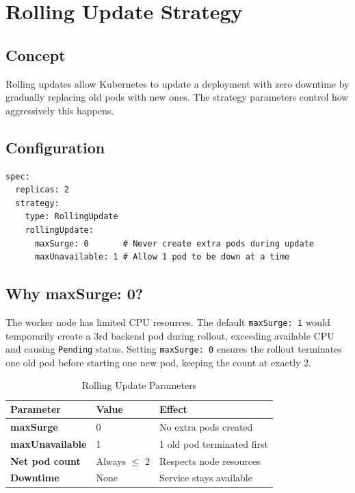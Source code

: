 \documentclass[12pt,a4paper]{report}
\begin{document}
\section{Rolling Update Strategy}

\subsection{Concept}

Rolling updates allow Kubernetes to update a deployment with zero downtime by gradually replacing old pods with new ones. The strategy parameters control how aggressively this happens.

\subsection{Configuration}

\begin{lstlisting}[style=yamlstyle, caption={Rolling Update Strategy (Backend)}]
spec:
  replicas: 2
  strategy:
    type: RollingUpdate
    rollingUpdate:
      maxSurge: 0       # Never create extra pods during update
      maxUnavailable: 1 # Allow 1 pod to be down at a time
\end{lstlisting}

\subsection{Why maxSurge: 0?}

The worker node has limited CPU resources. The default \texttt{maxSurge: 1} would temporarily create a 3rd backend pod during rollout, exceeding available CPU and causing \texttt{Pending} status. Setting \texttt{maxSurge: 0} ensures the rollout terminates one old pod before starting one new pod, keeping the count at exactly 2.

\begin{table}[H]
  \centering
  \begin{tabular}{>{\bfseries}p{4cm} p{4cm} p{5cm}}
    \toprule
    \textbf{Parameter} & \textbf{Value} & \textbf{Effect} \\
    \midrule
    maxSurge & 0 & No extra pods created \\
    maxUnavailable & 1 & 1 old pod terminated first \\
    Net pod count & Always $\leq$ 2 & Respects node resources \\
    Downtime & None & Service stays available \\
    \bottomrule
  \end{tabular}
  \caption{Rolling Update Parameters}
\end{table}
\end{document}
